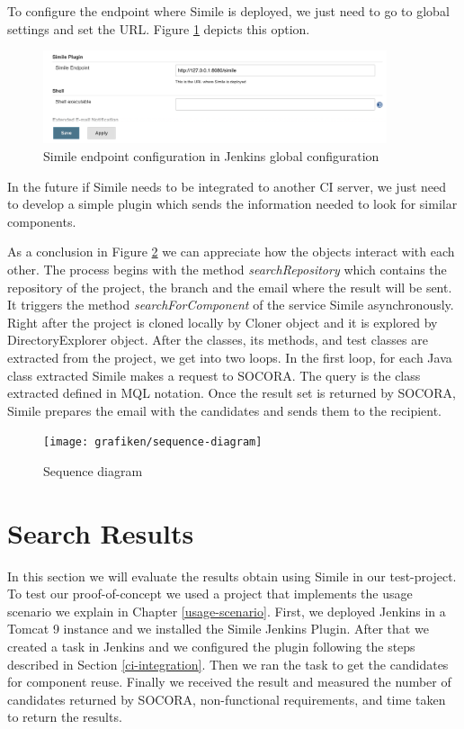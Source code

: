 To configure the endpoint where Simile is deployed, we just need to go to global settings and set the URL. Figure \ref{fig:simile-conf-02} depicts this option.

\begin{figure}[H]
	\centering
    \includegraphics[width=0.9\textwidth]{grafiken/simile-conf-02}
    \caption{Simile endpoint configuration in Jenkins global configuration}
    \label{fig:simile-conf-02}
\end{figure}

In the future if Simile needs to be integrated to another CI server, we just need to develop a simple plugin which sends the information needed to look for similar components.

As a conclusion in Figure \ref{fig:sequence-diagram} we can appreciate how the objects interact with each other. The process begins with the method \emph{searchRepository} which contains the repository of the project, the branch and the email where the result will be sent. It triggers the method \emph{searchForComponent} of the service Simile asynchronously. Right after the project is cloned locally by Cloner object and it is explored by DirectoryExplorer object. After the classes, its methods, and test classes are extracted from the project, we get into two loops. In the first loop, for each Java class extracted Simile makes a request to SOCORA. The query is the class extracted defined in MQL notation. Once the result set is returned by SOCORA, Simile prepares the email with the candidates and sends them to the recipient.
 
\begin{figure}[H]
	\centering
    \texttt{[image: grafiken/sequence-diagram]}
    \caption{Sequence diagram}
    \label{fig:sequence-diagram}
\end{figure}

\section{Search Results}
In this section we will evaluate the results obtain using Simile in our test-project. To test our proof-of-concept we used a project that implements the usage scenario we explain in Chapter \ref{usage-scenario}. First, we deployed Jenkins in a Tomcat 9 instance and we installed the Simile Jenkins Plugin. After that we created a task in Jenkins and we configured the plugin following the steps described in Section \ref{ci-integration}. Then we ran the task to get the candidates for component reuse. Finally we received the result and measured the number of candidates returned by SOCORA, non-functional requirements, and time taken to return the results.

